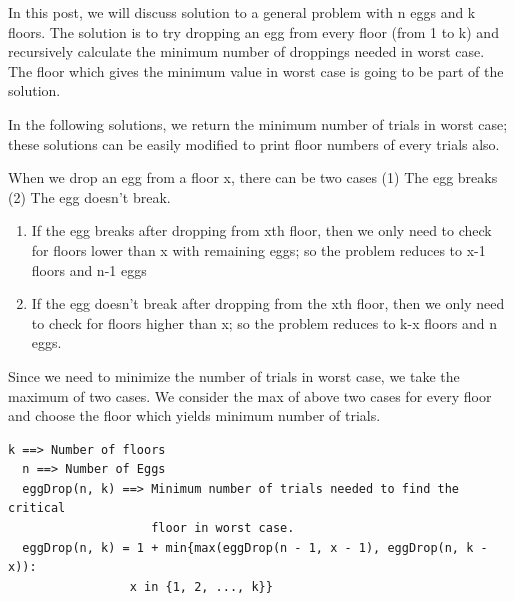 \RayNotesEnd

\textbf{}



In this post, we will discuss solution to a general problem with n eggs and
k floors. The solution is to try dropping an egg from every floor (from 1 to
k) and recursively calculate the minimum number of droppings needed in worst
case. The floor which gives the minimum value in worst case is going to be
part of the solution.

In the following solutions, we return the minimum number of trials in worst
case; these solutions can be easily modified to print floor numbers of every
trials also.


When we drop an egg from a floor x, there can be two cases (1) The egg
breaks (2) The egg doesn't break.
\begin{enumerate}[label=\textbf{\arabic*.}]
\item If the egg breaks after dropping from xth floor, then we only need to
  check for floors lower than x with remaining eggs; so the problem reduces
  to x-1 floors and n-1 eggs
\item If the egg doesn't break after dropping from the xth floor, then we
  only need to check for floors higher than x; so the problem reduces to k-x
  floors and n eggs.
\end{enumerate}

Since we need to minimize the number of trials in worst case, we take the
maximum of two cases. We consider the max of above two cases for every floor
and choose the floor which yields minimum number of trials.
\begin{lstlisting}[style=raygeneric]
  k ==> Number of floors
  n ==> Number of Eggs
  eggDrop(n, k) ==> Minimum number of trials needed to find the critical
                    floor in worst case.
  eggDrop(n, k) = 1 + min{max(eggDrop(n - 1, x - 1), eggDrop(n, k - x)): 
                 x in {1, 2, ..., k}}
\end{lstlisting}


